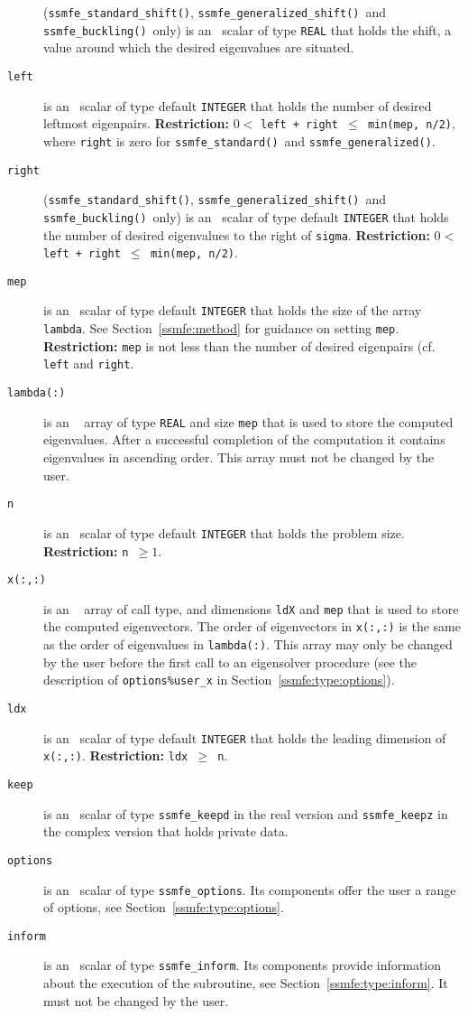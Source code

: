 \begin{description}
({\tt ssmfe\_standard\_shift()}, {\tt ssmfe\_generalized\_shift()}\
and {\tt ssmfe\_buckling()}\ only)
is an \intentin\ scalar of type \texttt{REAL}
that holds the shift, 
a value around which the desired eigenvalues %
are situated.
%
\item[\texttt{left}] is an \intentin\ scalar of type default \texttt{INTEGER}
that holds the number of desired leftmost eigenpairs.
{\bf Restriction:} {$0 <$ \tt left + right $\le$ min(mep, n/2)},
where {\tt right} is zero for 
{\tt ssmfe\_standard()}\ and {\tt ssmfe\_generalized()}.
%
\item[\texttt{right}] 
({\tt ssmfe\_standard\_shift()}, {\tt ssmfe\_generalized\_shift()}\
and {\tt ssmfe\_buckling()}\ only)
is an \intentin\ scalar of type default \texttt{INTEGER}
that holds the number of desired eigenvalues to the right of {\tt sigma}.
{\bf Restriction:} {\tt $0 < $ left + right $\le$ min(mep, n/2)}.
%
\item[\texttt{mep}] is an \intentin\ scalar of type default \texttt{INTEGER}
that holds the size of the array {\tt lambda}.
See Section~\ref{ssmfe:method} for guidance on
setting {\tt mep}.
{\bf Restriction:} 
{\tt mep} is not less than the number of desired eigenpairs
(cf. {\tt left} and {\tt right}.
%
\item[\texttt{lambda(:)}] is an \intentinout\ %
array of type \texttt{REAL}
and size {\tt mep} that is
used to store the computed eigenvalues.
After a successful completion of the computation
it contains eigenvalues in ascending order.
This array must not be changed by the user.
%
\item[\texttt{n}] is an \intentin\ scalar of type default \texttt{INTEGER}
that holds the problem size.
{\bf Restriction:} {\tt n $\ge 1$}.
%
\item[\texttt{x(:,:)}] is an \intentinout\ %
array of call type,
and dimensions {\tt ldX} and {\tt mep} that is
used to store the computed eigenvectors.
The order of eigenvectors in {\tt x(:,:)}
is the same as the order of eigenvalues in {\tt lambda(:)}.
This array may only be changed by the user
before the first call to an eigensolver procedure
(see the description of {\tt options\%user\_x} in Section~\ref{ssmfe:type:options}).
%
\item[\texttt{ldx}] is an \intentin\ scalar of type default \texttt{INTEGER}
that holds the leading dimension of {\tt x(:,:)}.
{\bf Restriction:} {\tt ldx $\ge$ n}.
%
\item[\texttt{keep}] is an \intentinout\ scalar of type 
{\tt ssmfe\_keepd} in the real version and
{\tt ssmfe\_keepz} in the complex version
that holds private data. 
%
\item[\texttt{options}] is an \intentin\  scalar  of type {\tt ssmfe\_options}.
Its components offer the user a range of options,
see Section~\ref{ssmfe:type:options}.
%
\item[\texttt{inform}] is an \intentinout\ scalar of type 
{\tt ssmfe\_inform}. Its components provide information about the execution
of the subroutine, see Section~\ref{ssmfe:type:inform}.
It must not be changed by the user.
%
\end{description}

